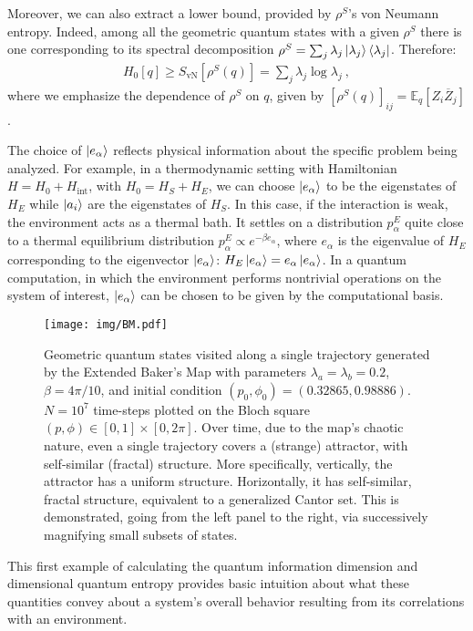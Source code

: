 \documentclass[draft,nofootinbib,pre,twocolumn,showkeys,superscriptaddress,preprintnumbers,floatfix]{revtex4-1}
\newcommand{\1}{\mathbbm{1}}
\begin{document}
Moreover, we can also extract a lower bound, provided by $\rho^S$'s von Neumann
entropy. Indeed, among all the geometric quantum states with a given $\rho^S$
there is one corresponding to its spectral decomposition $\rho^S = \sum_j
\lambda_j \ket{\lambda_j}\bra{\lambda_j}$. Therefore:
\begin{align*}
H_0[q]\geq S_{\mathrm{vN}}\left[ \rho^S(q)\right]=\sum_j \lambda_j \log \lambda_j
  ~,
\end{align*}
where we emphasize the dependence of $\rho^S$ on $q$, given by
$[\rho^{S}(q)]_{ij} = \mathbb{E}_q\left[ Z_i \overline{Z}_j\right]$.

The choice of $\ket{e_\alpha}$ reflects physical information about the specific
problem being analyzed. For example, in a thermodynamic setting with
Hamiltonian $H = H_0 + H_{\mathrm{int}}$, with $H_0 = H_S + H_E$, we can choose
$\ket{e_\alpha}$ to be the eigenstates of $H_E$ while $\ket{a_i}$ are the
eigenstates of $H_S$. In this case, if the interaction is weak, the environment
acts as a thermal bath. It settles on a distribution $p_\alpha^E$ quite close to
a thermal equilibrium distribution $p_\alpha^E \propto e^{-\beta e_\alpha}$,
where $e_\alpha$ is the  eigenvalue of $H_E$ corresponding to the eigenvector
$\ket{e_\alpha}$: $H_E \ket{e_\alpha} = e_\alpha \ket{e_\alpha}$. In a
quantum computation, in which the environment performs nontrivial operations on
the system of interest, $\ket{e_\alpha}$ can be chosen to be given by the
computational basis.

\begin{figure*}
\texttt{[image: img/BM.pdf]}
\caption{Geometric quantum states visited along a single trajectory generated
	by the Extended Baker's Map with parameters $\lambda_a=\lambda_b=0.2$,
	$\beta=4\pi/10$, and initial condition $(p_0,\phi_0)=(0.32865,0.98886)$.
	$N=10^7$ time-steps plotted on the Bloch square $(p,\phi) \in [0,1] \times
	[0,2\pi]$. Over time, due to the map's chaotic nature, even a single
	trajectory covers a (strange) attractor, with self-similar (fractal)
	structure. More specifically, vertically, the attractor has a uniform
	structure. Horizontally, it has self-similar, fractal structure,
	equivalent to a generalized Cantor set. This is demonstrated, going from
	the left panel to the right, via successively magnifying small subsets of
	states.
	}
\label{fig:BM_Attractor} 
\end{figure*}

This first example of calculating the quantum information dimension and
dimensional quantum entropy provides basic intuition about what these
quantities convey about a system's overall behavior resulting from its
correlations with an environment.
\end{document}
